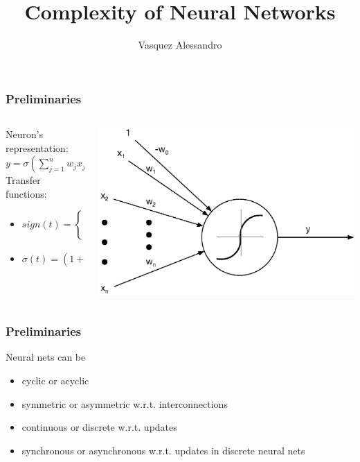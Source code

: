 \documentclass{beamer}
\title{Complexity of Neural Networks}
\author{Vasquez Alessandro}
\institute{Université Nice-Sophia-Antipolis}
\begin{document}
\frame{\titlepage}
\begin{frame}
\frametitle{Preliminaries}
\begin{columns}
	\begin{column}{0.47\textwidth}
		Neuron's representation:
		$y = \sigma (\sum_{j=1}^{n}w_jx_j - w_0)$ \\
		Transfer functions: 
		\begin{itemize}
			\item $   
			sign(t)  = 
			\begin{cases}
			0 &\quad\text{if } t \leq 0\\
			1 &\quad\text{if } t > 0 \\
			\end{cases}
			$
			\item $\sigma (t) = (1+e^{-t})^{-1}$
		\end{itemize}
	\end{column}
	\begin{column}{0.5\textwidth}
		\includegraphics[width=1.1\textwidth]{images/neuron.eps}
	\end{column}
\end{columns}

\end{frame}


\begin{frame}
\frametitle{Preliminaries}
Neural nets can be
\begin{itemize}
	\item cyclic or acyclic
	\item symmetric or asymmetric w.r.t. interconnections
	\item continuous or discrete w.r.t. updates
	\item synchronous or asynchronous w.r.t. updates in discrete neural nets
\end{itemize}
\end{frame}
\end{document}
